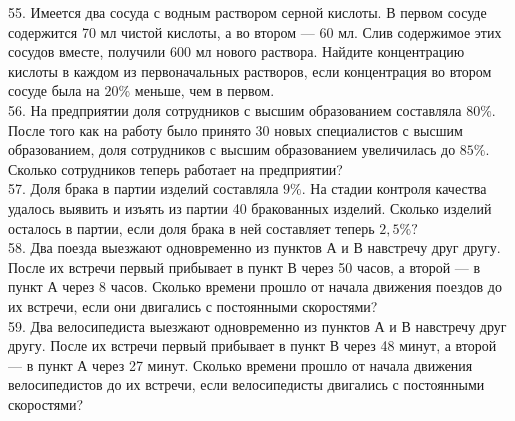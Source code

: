 \documentclass[12pt]{article}
\begin{document}
55. Имеется два сосуда с водным раствором серной кислоты. В первом сосуде содержится 70 мл чистой кислоты, а во втором --- 60 мл. Слив содержимое этих сосудов вместе, получили 600 мл нового раствора. Найдите концентрацию кислоты в каждом из первоначальных растворов, если концентрация во втором сосуде была на $20\%$ меньше, чем в первом.\\
56. На предприятии доля сотрудников с высшим образованием составляла $80\%.$ После того как на работу было принято 30 новых специалистов с высшим образованием, доля сотрудников с высшим образованием увеличилась до $85\%.$ Сколько сотрудников теперь работает на предприятии?\\
57. Доля брака в партии изделий составляла $9\%.$ На стадии контроля качества удалось выявить и изъять из партии 40 бракованных изделий. Сколько изделий осталось в партии, если доля брака в ней составляет теперь $2,5\%?$\\
58. Два поезда выезжают одновременно из пунктов А и В навстречу друг другу. После их встречи первый прибывает в пункт В через 50 часов, а второй --- в пункт А через 8 часов. Сколько времени прошло от начала движения поездов до их встречи, если они двигались с постоянными скоростями?\\
59. Два велосипедиста выезжают одновременно из пунктов А и В навстречу друг другу. После их встречи первый прибывает в пункт В через 48 минут, а второй --- в пункт А через 27 минут. Сколько времени прошло от начала движения велосипедистов до их встречи, если велосипедисты двигались с постоянными скоростями?
\newpage
\end{document}
